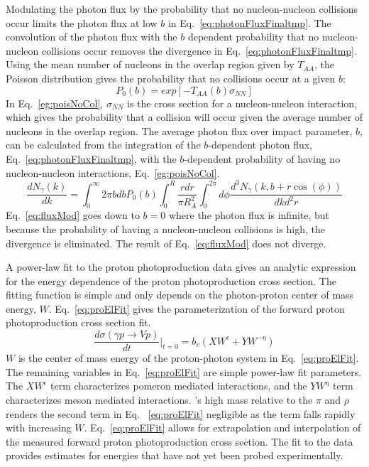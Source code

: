     Modulating the photon flux by the probability that no nucleon-nucleon 
      collisions occur limits the photon flux at low $b$ in Eq.~\ref{eq:photonFluxFinaltmp}.
    The convolution of the photon flux with the $b$ dependent probability that 
      no nucleon-nucleon collisions occur removes the divergence in 
      Eq.~\ref{eq:photonFluxFinaltmp}. 
    Using the mean number of nucleons in the overlap region given by $T_{AA}$, 
      the Poisson distribution gives the probability that no collisions 
      occur at a given $b$:
    \begin{equation} \label{eg:poisNoCol}
      P_{0}(b)=exp[-T_{AA}(b)\sigma_{NN}]
    \end{equation}
    In Eq.~\ref{eg:poisNoCol}, $\sigma_{NN}$ is the cross section for a 
      nucleon-nucleon interaction, which gives the probability that a collision
      will occur given the average number of nucleons in the overlap region.
    The average photon flux over impact parameter, $b$, can be calculated 
      from the integration of the $b$-dependent photon flux, Eq.~\ref{eq:photonFluxFinaltmp}, 
      with the $b$-dependent probability of having no nucleon-nucleon 
      interactions, Eq.~\ref{eg:poisNoCol}. 
    \begin{equation} \label{eq:fluxMod}
      \frac{dN_{\gamma}(k)}{dk}=\int_{0}^{\infty}{2\pi bdbP_{0}(b)
         \int_{0}^{R}{\frac{rdr}{\pi R^{2}_{A}}\int_{0}^{2\pi}d\phi
         \frac{d^{3}N_{\gamma}(k,b+r\cos(\phi))}{dkd^{2}r}}}
    \end{equation}
    Eq.~\ref{eq:fluxMod} goes down to $b=0$ where the photon flux is infinite, but 
      because the probability of having a nucleon-nucleon collisions is high, 
      the divergence is eliminated.
    The result of Eq.~\ref{eq:fluxMod} does not diverge.  

    A power-law fit to the proton photoproduction data gives an analytic 
      expression for the energy dependence of the proton photoproduction 
      cross section.
    The fitting function is simple and only depends on the photon-proton center
      of mass energy, $W$. 
    Eq.~\ref{eq:proElFit} gives the parameterization of the forward 
      proton photoproduction cross section fit. 
    \begin{equation} \label{eq:proElFit}
      \frac{d\sigma(\gamma p\rightarrow Vp)}{dt}\Big|_{t=0}
        =b_{v}(XW^{\epsilon}+YW^{-\eta})
    \end{equation}
    $W$ is the center of mass energy of the proton-photon system in 
      Eq.~\ref{eq:proElFit}.
    The remaining variables in Eq.~\ref{eq:proElFit} are simple power-law fit
      parameters.  
    The $XW^{\epsilon}$ term characterizes pomeron mediated interactions, and
      the $YW^{\eta}$ term characterizes meson mediated interactions\cite{vmd1999}. 
    \JPsi{}'s high mass relative to the $\pi$ and $\rho$ renders the second 
      term in Eq. ~\ref{eq:proElFit} negligible as the term falls rapidly with
      increasing $W$. 
    Eq.~\ref{eq:proElFit} allows for extrapolation and interpolation of the 
      measured forward proton photoproduction cross section. 
    The fit to the data provides estimates for energies that have not yet been 
      probed experimentally.

